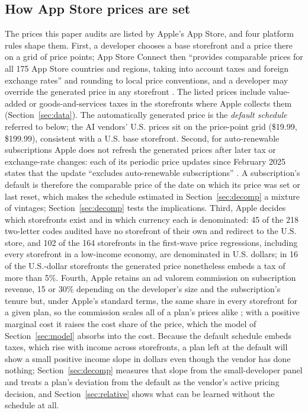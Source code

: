 \documentclass[11pt]{article}
\theoremstyle{definition}
\theoremstyle{remark}
\begin{document}
\subsection{How App Store prices are set}\label{sec:appstore}

The prices this paper audits are listed by Apple's App Store, and four platform rules shape them. First, a developer chooses a base storefront and a price there on a grid of price points; App Store Connect then ``provides comparable prices for all 175 App Store countries and regions, taking into account taxes and foreign exchange rates'' and rounding to local price conventions, and a developer may override the generated price in any storefront \citep{apple2026pricing,apple2026subscriptions}. The listed prices include value-added or goods-and-services taxes in the storefronts where Apple collects them (Section~\ref{sec:data}). The automatically generated price is the \emph{default schedule} referred to below; the AI vendors' U.S. prices sit on the price-point grid (\$19.99, \$199.99), consistent with a U.S. base storefront. Second, for auto-renewable subscriptions Apple does not refresh the generated prices after later tax or exchange-rate changes: each of its periodic price updates since February 2025 states that the update ``excludes auto-renewable subscriptions'' \citep{apple2026taxupdates}. A subscription's default is therefore the comparable price of the date on which its price was set or last reset, which makes the schedule estimated in Section~\ref{sec:decomp} a mixture of vintages; Section~\ref{sec:decomp} tests the implications. Third, Apple decides which storefronts exist and in which currency each is denominated: 45 of the 218 two-letter codes audited have no storefront of their own and redirect to the U.S. store, and 102 of the 164 storefronts in the first-wave price regressions, including every storefront in a low-income economy, are denominated in U.S. dollars; in 16 of the U.S.-dollar storefronts the generated price nonetheless embeds a tax of more than 5\%. Fourth, Apple retains an ad valorem commission on subscription revenue, 15 or 30\% depending on the developer's size and the subscription's tenure but, under Apple's standard terms, the same share in every storefront for a given plan, so the commission scales all of a plan's prices alike \citep{wang2017advalorem}; with a positive marginal cost it raises the cost share of the price, which the model of Section~\ref{sec:model} absorbs into the cost. Because the default schedule embeds taxes, which rise with income across storefronts, a plan left at the default will show a small positive income slope in dollars even though the vendor has done nothing; Section~\ref{sec:decomp} measures that slope from the small-developer panel and treats a plan's deviation from the default as the vendor's active pricing decision, and Section~\ref{sec:relative} shows what can be learned without the schedule at all.
\end{document}
